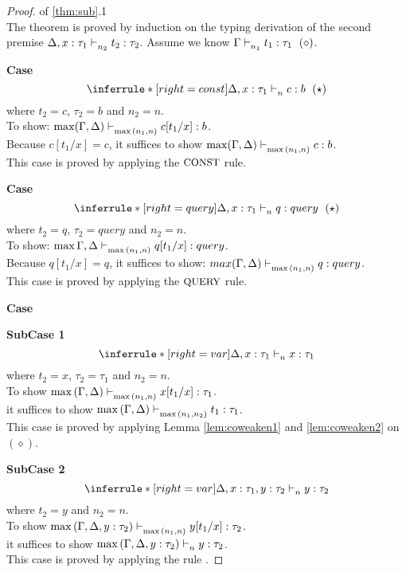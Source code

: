 \documentclass{article}
\begin{document}
\begin{proof} of \ref{thm:sub}.1 \\
  The theorem is proved by induction on the typing derivation of the second premise $\Delta, x: \tau_1 \mathrel{\vdash_{n_2}^{} {t_2} : {\tau_2}} $. Assume we know $\Gamma \mathrel{\vdash_{n_1}^{} {t_1} : {\tau_1}} ~ (\diamond)$.

\noindent \textbf{Case} 
$$
   \inferrule*[right = const]
   {\empty}
   {\Delta, x: \tau_1 \jtype{n}{}{c}{b} ~(\star) }
$$
where $t_2 = c$, $\tau_2 = b$ and $n_2 = n$.\\
To show: $\max(\Gamma, \Delta) \mathrel{\vdash_{\max{(n_1, n)}}^{} {c[t_1/x]} : {b}} $.\\
Because $c[t_1/x] = c$, it suffices to show $\max(\Gamma, \Delta) \mathrel{\vdash_{\max{(n_1, n)}}^{} {c} : {b}} $.\\
This case is proved by applying the $\mbox{\small{CONST}}$ rule. 

\noindent \textbf{Case} 
$$
    \inferrule*[right = query]
   {\empty}
   {\Delta, x: \tau_1 \jtype{n}{}{q}{query} ~ (\star) }
$$
where $t_2 = q$, $\tau_2 = query$ and $n_2 = n$.\\
To show: $\max{\Gamma, \Delta} \mathrel{\vdash_{\max{(n_1, n)}}^{} {q[t_1/x]} : {query}} $.\\
Because $q[t_1/x] = q$, it suffices to show: $max(\Gamma, \Delta) \mathrel{\vdash_{\max{(n_1, n)}}^{} {q} : {query}} $.\\
This case is proved by applying the $\mbox{\small{QUERY}}$ rule. 


\noindent \textbf{Case} 

\noindent \textbf{SubCase 1} 
$$
    \inferrule*[ right = var]
   {\empty}
   {\Delta, x:\tau_1 \jtype{n}{}{x}{\tau_1}  } 
$$
where $t_2 = x$, $\tau_2 = \tau_1$ and $n_2 = n$.\\
To show $\max{(\Gamma, \Delta)} \mathrel{\vdash_{\max{(n_1, n)}}^{} {x[t_1/x]} : {\tau_1}} $.\\
it suffices to show $\max{(\Gamma, \Delta)} \mathrel{\vdash_{\max{(n_1, n_2)}}^{} {t_1} : {\tau_1}}$.\\
This case is proved by applying Lemma \ref{lem:coweaken1} and \ref{lem:coweaken2} on $(\diamond)$.

\noindent \textbf{SubCase 2} 
$$
    \inferrule*[ right = var]
   {\empty}
   {\Delta, x:\tau_1, y : \tau_2 \jtype{n}{}{y}{\tau_2}} 
$$
where $t_2 = y$ and $n_2 = n$.\\ 
To show $\max{(\Gamma, \Delta, y : \tau_2)} \mathrel{\vdash_{\max{(n_1, n)}}^{} {y[t_1/x]} : {\tau_2}} $.\\
it suffices to show $\max{(\Gamma, \Delta, y : \tau_2)} \mathrel{\vdash_{n}^{} {y} : {\tau_2}}$.\\
This case is proved by applying the rule .


\end{proof}
\end{document}
